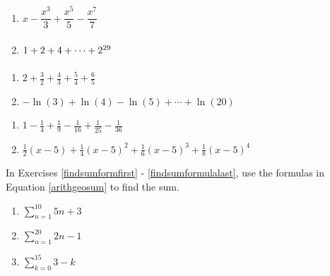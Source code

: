 \documentclass{ximera}
\begin{document}
\begin{multicols}{2}
\begin{enumerate}
\setcounter{enumi}{\value{HW}}

\item $x - \dfrac{x^{3}}{3} + \dfrac{x^{5}}{5} - \dfrac{x^{7}}{7}$
\item $1 + 2 + 4 + \cdots + 2^{29} \vphantom{x - \dfrac{x^{3}}{3} + \dfrac{x^{5}}{5} - \dfrac{x^{7}}{7}}$

\setcounter{HW}{\value{enumi}}
\end{enumerate}
\end{multicols}

\begin{multicols}{2}
\begin{enumerate}
\setcounter{enumi}{\value{HW}}

\item $2 + \frac{3}{2} + \frac{4}{3} + \frac{5}{4} + \frac{6}{5}$
\item $-\ln(3) + \ln(4) - \ln(5) + \cdots + \ln(20)$

\setcounter{HW}{\value{enumi}}
\end{enumerate}
\end{multicols}

\begin{multicols}{2}
\begin{enumerate}
\setcounter{enumi}{\value{HW}}

\item $1 - \frac{1}{4} + \frac{1}{9} - \frac{1}{16} + \frac{1}{25} - \frac{1}{36}$
\item $\frac{1}{2}(x - 5) + \frac{1}{4}(x - 5)^{2} + \frac{1}{6}(x - 5)^{3} + \frac{1}{8}(x - 5)^{4}$  \label{writesumlast}

\setcounter{HW}{\value{enumi}}
\end{enumerate}
\end{multicols}


In Exercises \ref{findsumformfirst} - \ref{findsumformulalast}, use the formulas in Equation \ref{arithgeosum} to find the sum.

\begin{multicols}{3}
\begin{enumerate}
\setcounter{enumi}{\value{HW}}

\item $\displaystyle \sum_{n = 1}^{10} 5n+3$ \label{findsumformfirst}

\item $\displaystyle \sum_{n = 1}^{20} 2n-1$ 

\item $\displaystyle \sum_{k = 0}^{15} 3-k$ 

\setcounter{HW}{\value{enumi}}
\end{enumerate}
\end{multicols}
\end{document}
